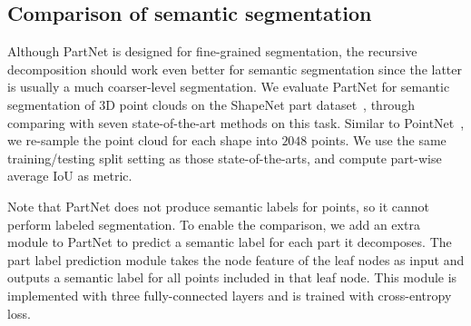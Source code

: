 \subsection{Comparison of semantic segmentation}
\label{subsec:semantic}
Although PartNet is designed for fine-grained segmentation, the recursive decomposition should work even better for semantic segmentation since the latter is usually a much coarser-level segmentation. We evaluate PartNet for semantic segmentation of 3D point clouds on the ShapeNet part dataset~\cite{Yi16}, through comparing with seven state-of-the-art methods on this task. Similar to PointNet~\cite{qi2016pointnet}, we re-sample the point cloud for each shape into $2048$ points. We use the same training/testing split setting as those state-of-the-arts, and compute part-wise average IoU as metric.

Note that PartNet does not produce semantic labels for points, so it cannot perform labeled segmentation. To enable the comparison, we add an extra module to PartNet to predict a semantic label for each part it decomposes. The part label prediction module takes the node feature of the leaf nodes as input and outputs a semantic label for all points included in that leaf node. This module is implemented with three fully-connected layers and is trained with cross-entropy loss.

